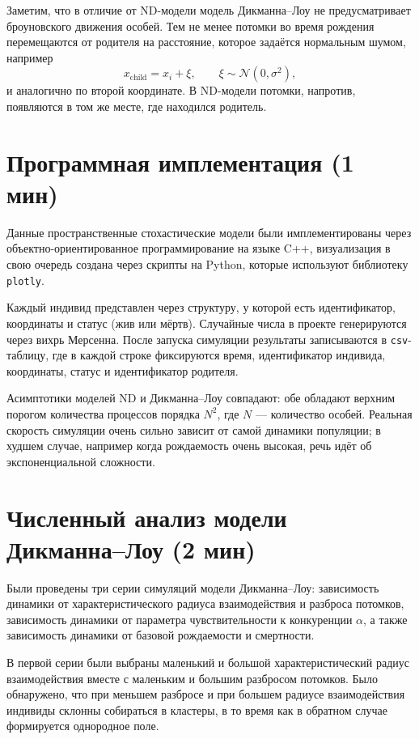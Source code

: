 \documentclass[12pt,a4paper]{article}
\begin{document}
Заметим, что в отличие от ND-модели модель Дикманна--Лоу не предусматривает броуновского движения особей. Тем не менее потомки во время рождения перемещаются от родителя на расстояние, которое задаётся нормальным шумом, например
\[
x_{\text{child}} = x_i + \xi,
\qquad
\xi \sim \mathcal{N}(0, \sigma^2),
\]
и аналогично по второй координате. В ND-модели потомки, напротив, появляются в том же месте, где находился родитель.

\section*{Программная имплементация (1 мин)}
Данные пространственные стохастические модели были имплементированы через объектно-ориентированное программирование на языке C++, визуализация в свою очередь создана через скрипты на Python, которые используют библиотеку \texttt{plotly}.

Каждый индивид представлен через структуру, у которой есть идентификатор, координаты и статус (жив или мёртв). Случайные числа в проекте генерируются через вихрь Мерсенна. После запуска симуляции результаты записываются в \texttt{csv}-таблицу, где в каждой строке фиксируются время, идентификатор индивида, координаты, статус и идентификатор родителя.

Асимптотики моделей ND и Дикманна--Лоу совпадают: обе обладают верхним порогом количества процессов порядка $N^2$, где $N$ --- количество особей. Реальная скорость симуляции очень сильно зависит от самой динамики популяции; в худшем случае, например когда рождаемость очень высокая, речь идёт об экспоненциальной сложности.

\section*{Численный анализ модели Дикманна--Лоу (2 мин)}
Были проведены три серии симуляций модели Дикманна--Лоу: зависимость динамики от характеристического радиуса взаимодействия и разброса потомков, зависимость динамики от параметра чувствительности к конкуренции $\alpha$, а также зависимость динамики от базовой рождаемости и смертности.

В первой серии были выбраны маленький и большой характеристический радиус взаимодействия вместе с маленьким и большим разбросом потомков. Было обнаружено, что при меньшем разбросе и при большем радиусе взаимодействия индивиды склонны собираться в кластеры, в то время как в обратном случае формируется однородное поле.
\end{document}
